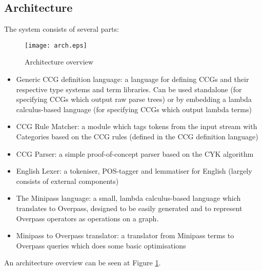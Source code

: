 \documentclass[main.tex]{subfiles}
\begin{document}
\subsection{Architecture}
The system consists of several parts:

\begin{figure}[htbp!]
    \texttt{[image: arch.eps]}
    \caption{Architecture overview}
    \label{arch}
\end{figure}

\begin{itemize}
    \item Generic CCG definition language: a language for defining CCGs and
          their respective type systems and term libraries. Can be used
          standalone (for specifying CCGs which output raw parse trees)
          or by embedding a lambda calculus-based language (for specifying
          CCGs which output lambda terms)

    \item CCG Rule Matcher: a module which tags tokens from the input stream
          with Categories based on the CCG rules (defined in the CCG definition
          language)

    \item CCG Parser: a simple proof-of-concept parser based on the CYK
          algorithm

    \item English Lexer: a tokeniser, POS-tagger and lemmatiser for English
          (largely consists of external components)

    \item The Minipass language: a small, lambda calculus-based language
          which translates to Overpass, designed to be easily generated and
          to represent Overpass operators as operations on a graph.

    \item Minipass to Overpass translator: a translator from Minipass terms
          to Overpass queries which does some basic optimisations
\end{itemize}

An architecture overview can be seen at Figure \ref{arch}.
\end{document}
